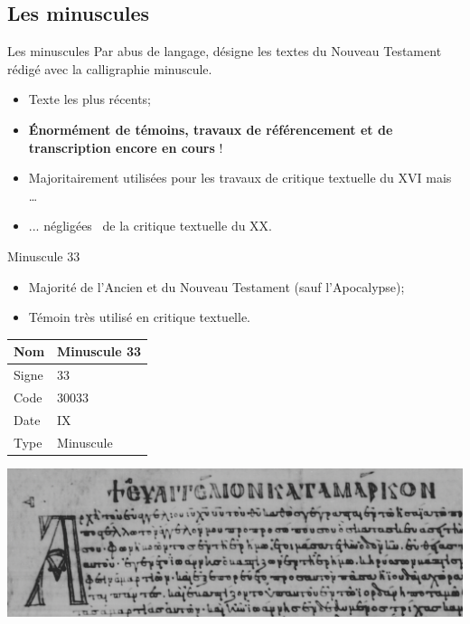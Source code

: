 \documentclass[11pt]{beamer}
\begin{document}
\subsection{Les minuscules}

\begin{frame}{Les minuscules}
Par abus de langage, désigne les textes du Nouveau Testament rédigé avec la calligraphie minuscule.
\pause
\begin{block}{}
    \begin{itemize}
        \item Texte les plus récents;
        \item \textbf{Énormément de témoins, travaux de référencement et de transcription encore en cours} !
        \item Majoritairement utilisées pour les travaux de critique textuelle du XVI\ieme{} mais \dots
        \item ... \og négligées \fg\ de la critique textuelle du XX\ieme{}.
    \end{itemize}
\end{block}

\end{frame}

\begin{frame}{Minuscule 33}
        \begin{block}{}
        \begin{itemize}
            \item Majorité de l'Ancien et du Nouveau Testament (sauf l'Apocalypse);
            \item Témoin très utilisé en critique textuelle.
        \end{itemize}
    \end{block}
    \vfill
    \begin{minipage}{.45\textwidth}
\begin{tabularx}{\textwidth}{l|X}
    \small
     Nom & Minuscule 33 \\
     \hline
     Signe & 33 \\
     \hline
     Code & 30033\\
     \hline
     Date & IX\ieme{} \\
     \hline
     Type & Minuscule \\
\end{tabularx}
\end{minipage}
\hfill
\begin{minipage}{.45\textwidth}
    \includegraphics[scale=.16]{img/minuscule33.png}
\end{minipage}
\end{frame}
\end{document}
